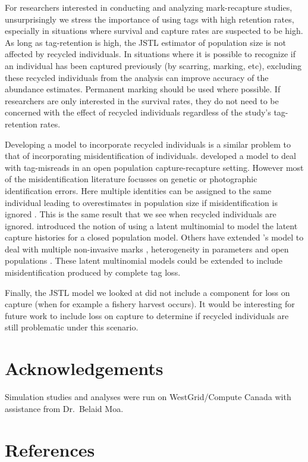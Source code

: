 \documentclass[]{article}
\begin{document}
For researchers interested in conducting and analyzing mark-recapture
studies, unsurprisingly we stress the importance of using tags with high retention
rates, especially in situations where survival and capture rates are
suspected to be high. As long as tag-retention is high, the JSTL
estimator of population size is not affected by recycled individuals. In
situations where it is possible to recognize if an individual has been
captured previously (by scarring, marking, etc), excluding these
recycled individuals from the analysis can improve accuracy of the
abundance estimates. Permanent marking should be used where possible. If
researchers are only interested in the survival rates, they do not need
to be concerned with the effect of recycled individuals regardless of
the study's tag-retention rates.

Developing a model to incorporate recycled individuals is a similar problem to that of incorporating misidentification of individuals.  \cite{Schwarz:1999} developed a model to deal with tag-misreads in an open population capture-recapture setting.  However most of the misidentification literature focusses on genetic or photographic identification errors.  Here multiple identities can be assigned to the same individual leading to overestimates in population size if misidentification is ignored \citep{Yoshizaki:2011}. This is the same result that we see when recycled individuals are ignored.   \cite{Link:2010} introduced the notion of using a latent multinomial to model the latent capture histories for a closed population model. Others have extended \citeauthor{Link:2010}'s model to deal with multiple non-invasive marks \citep{Bonner:2013, McClintock:2013}, heterogeneity in parameters \citep{Mcclintock:2014} and open populations \citep{Bonner:2013}.  These latent multinomial models could be extended to include misidentification produced by complete tag loss.

Finally, the JSTL model we looked at did not include a component for loss on capture (when for example a fishery harvest occurs).  It would be interesting for future work to include loss on capture to determine if recycled individuals are still problematic under this scenario.

\section{Acknowledgements}\label{acknowledgements}
Simulation studies and analyses were run on WestGrid/Compute Canada with
assistance from Dr.~Belaid Moa.

\section{References}\label{references}




\bigskip




\end{document}
